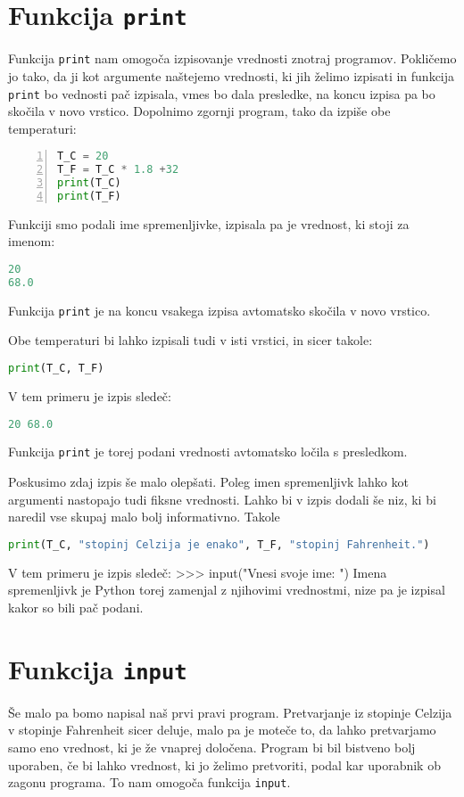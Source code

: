 \section{Funkcija \texttt{print}}
Funkcija \texttt{print} nam omogoča izpisovanje vrednosti znotraj programov. Pokličemo jo tako, da ji kot argumente naštejemo vrednosti, ki jih želimo izpisati in funkcija \texttt{print} bo vednosti pač izpisala, vmes bo dala presledke, na koncu izpisa pa bo skočila v novo vrstico. Dopolnimo zgornji program, tako da izpiše obe temperaturi:
\begin{lstlisting}[language=Python, showstringspaces=false,numbers=left]
T_C = 20
T_F = T_C * 1.8 +32
print(T_C)
print(T_F)
\end{lstlisting}
Funkciji smo podali ime spremenljivke, izpisala pa je vrednost, ki stoji za imenom:
\begin{lstlisting}[language=Python, showstringspaces=false]
20
68.0
\end{lstlisting}
Funkcija \texttt{print} je na koncu vsakega izpisa avtomatsko skočila v novo vrstico.

Obe temperaturi bi lahko izpisali tudi v isti vrstici, in sicer takole:
\begin{lstlisting}[language=Python, showstringspaces=false]
print(T_C, T_F)
\end{lstlisting}
V tem primeru je izpis sledeč:
\begin{lstlisting}[language=Python, showstringspaces=false]
20 68.0
\end{lstlisting}
Funkcija \texttt{print} je torej podani vrednosti avtomatsko ločila s presledkom. 

Poskusimo zdaj izpis še malo olepšati. Poleg imen spremenljivk lahko kot argumenti nastopajo tudi fiksne vrednosti. Lahko bi v izpis dodali še niz, ki bi naredil vse skupaj malo bolj informativno. Takole
\begin{lstlisting}[language=Python, showstringspaces=false]
print(T_C, "stopinj Celzija je enako", T_F, "stopinj Fahrenheit.")
\end{lstlisting}
V tem primeru je izpis sledeč:
>>> input("Vnesi svoje ime: ")
Imena spremenljivk je Python torej zamenjal z njihovimi vrednostmi, nize pa je izpisal kakor so bili pač podani.

\section{Funkcija \texttt{input}}
Še malo pa bomo napisal naš prvi pravi program. Pretvarjanje iz stopinje Celzija v stopinje Fahrenheit sicer deluje, malo pa je moteče to, da lahko pretvarjamo samo eno vrednost, ki je že vnaprej določena. Program bi bil bistveno bolj uporaben, če bi lahko vrednost, ki jo želimo pretvoriti, podal kar uporabnik ob zagonu programa. To nam omogoča funkcija \texttt{input}.

